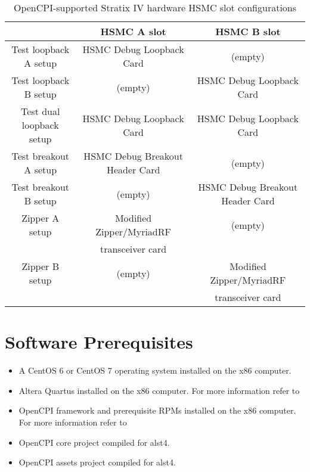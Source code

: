 \documentclass{article}
\begin{document}
\begin{center}
        \begin{table}[!htbp]
        \centering
        \caption{OpenCPI-supported Stratix IV hardware HSMC slot configurations}
        \label{table:supported_slots}
        \begin{tabular}{c|c|c|}
                \cline{2-3}
                & HSMC A slot & HSMC B slot \\ \hline
                \multicolumn{1}{|c|}{Test loopback A setup} & HSMC Debug Loopback Card & (empty)\\ \hline
                \multicolumn{1}{|c|}{Test loopback B setup} & (empty) & HSMC Debug Loopback Card \\ \hline
                \multicolumn{1}{|c|}{Test dual loopback setup} & HSMC Debug Loopback Card & HSMC Debug Loopback Card \\ \hline
                \multicolumn{1}{|c|}{Test breakout A setup} & HSMC Debug Breakout Header Card & (empty)\\ \hline
                \multicolumn{1}{|c|}{Test breakout B setup} & (empty) & HSMC Debug Breakout Header Card \\ \hline
                \multicolumn{1}{|c|}{Zipper A setup} & Modified\cite{zipper_mods} Zipper/MyriadRF & (empty)\\
                \multicolumn{1}{|c|}{ } & transceiver card & \\ \hline
                \multicolumn{1}{|c|}{Zipper B setup} & (empty) & Modified\cite{zipper_mods} Zipper/MyriadRF \\
                \multicolumn{1}{|c|}{ } & & transceiver card \\ \hline
        \end{tabular}
        \end{table}
\end{center}

\section{Software Prerequisites}
\begin{itemize}
\item A CentOS 6 or CentOS 7 operating system installed on the x86 computer.
\item Altera Quartus installed on the x86 computer. For more information refer to \cite{fpga_vendor_tool_guide}
\item OpenCPI framework and prerequisite RPMs installed on the x86 computer. For more information refer to \cite{rpm_installation_guide}
\item OpenCPI core project compiled for alst4.
\item OpenCPI assets project compiled for alst4.
\end{itemize}
\end{document}
